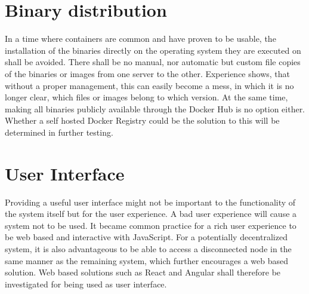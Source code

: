\section{Binary distribution}

In a time where containers are common and have proven to be usable, the installation of the binaries directly on the operating system they are executed on shall be avoided.
There shall be no manual, nor automatic but custom file copies of the binaries or images from one server to the other.
Experience shows, that without a proper management, this can easily become a mess, in which it is no longer clear, which files or images belong to which version.
At the same time, making all binaries publicly available through the Docker Hub\cite{docker:hub} is no option either.
Whether a self hosted Docker Registry\cite{docker:registry} could be the solution to this will be determined in further testing.

\section{User Interface}

Providing a useful user interface might not be important to the functionality of the system itself but for the user experience.
A bad user experience will cause a system not to be used.
It became common practice for a rich user experience to be web based and interactive with JavaScript.
For a potentially decentralized system, it is also advantageous to be able to access a disconnected node in the same manner as the remaining system, which further encourages a web based solution.
Web based solutions such as React and Angular shall therefore be investigated for being used as user interface.
